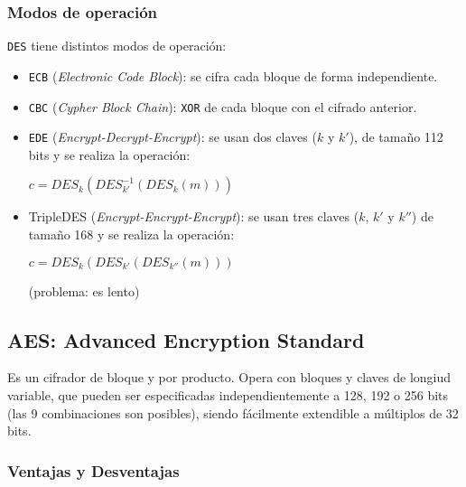 \subsubsection{Modos de operación}
\texttt{DES} tiene distintos modos de operación:
\begin{itemize}
	\item \texttt{ECB} (\emph{Electronic Code Block}): se cifra cada bloque de forma independiente.
	\item \texttt{CBC} (\emph{Cypher Block Chain}): \texttt{XOR} de cada bloque con el cifrado anterior.
	\item \texttt{EDE} (\emph{Encrypt-Decrypt-Encrypt}): se usan dos claves ($k$ y $k'$), de tamaño 112 bits y se realiza la operación:
	\begin{center}
		$c = DES_k(DES^{-1}_{k'}(DES_{k}(m)))$
	\end{center}
	\item TripleDES (\emph{Encrypt-Encrypt-Encrypt}): se usan tres claves ($k$, $k'$ y $k''$) de tamaño 168 y se realiza la operación:
	\begin{center}
		$c = DES_k(DES_{k'}(DES_{k''}(m)))$
	\end{center}
	(problema: es lento)
\end{itemize}

\subsection{AES: Advanced Encryption Standard}
Es un cifrador de bloque y por producto. Opera con bloques y claves de longiud variable, que pueden ser especificadas independientemente a 128, 192 o 256 bits (las 9 combinaciones son posibles), siendo fácilmente extendible a múltiplos de 32 bits.

\subsubsection{Ventajas y Desventajas}

